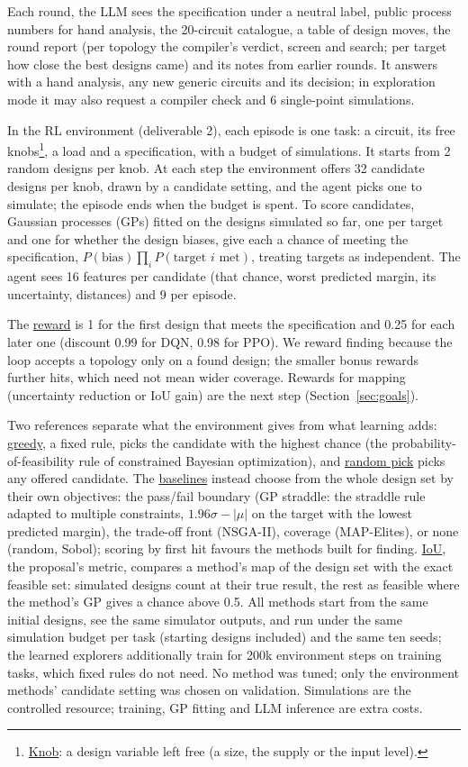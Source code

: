 \documentclass[10pt]{article}
\begin{document}
Each round, the LLM sees the specification under a neutral label, public process numbers for hand analysis, the 20-circuit catalogue, a table of design moves, the round
report (per topology the compiler's verdict, screen and search; per target how close the best designs came) and its
notes from earlier rounds. It answers with a hand analysis, any new generic circuits and its decision; in exploration
mode it may also request a compiler check and 6 single-point simulations.

In the RL environment (deliverable 2), each episode is one task: a circuit, its free knobs\footnote{\uline{Knob}: a design variable left free (a size, the supply or the input level).}, a load and a specification,
with a budget of simulations. It starts from 2 random designs per knob. At each step the environment offers 32
candidate designs per knob, drawn by a candidate setting, and the agent picks one to simulate; the episode ends when
the budget is spent. To score candidates, Gaussian processes (GPs) fitted on the designs simulated so far, one per
target and one for whether the design biases, give each a chance of meeting the specification,
$P(\text{bias})\prod_i P(\text{target } i \text{ met})$, treating targets as independent. The agent sees 16 features
per candidate (that chance, worst predicted margin, its uncertainty, distances) and 9 per episode.

The \uline{reward} is 1 for the first design that meets the specification and 0.25 for each later one (discount 0.99
for DQN, 0.98 for PPO). We reward finding because the loop accepts a topology only on a found design; the smaller
bonus rewards further hits, which need not mean wider coverage. Rewards for mapping (uncertainty reduction or IoU gain) are the next step (Section~\ref{sec:goals}).

Two references separate what the environment gives from what learning adds: \uline{greedy}, a fixed rule, picks the
candidate with the highest chance (the probability-of-feasibility rule of constrained Bayesian optimization), and
\uline{random pick} picks any offered candidate. The \uline{baselines} instead choose from the whole design set by
their own objectives: the pass/fail boundary (GP straddle: the straddle rule~\cite{bryan,gotovos} adapted to multiple
constraints, $1.96\sigma - |\mu|$ on the target with the lowest predicted margin), the trade-off front (NSGA-II), coverage (MAP-Elites), or none (random,
Sobol); scoring by first hit favours the methods built for finding. \uline{IoU}, the proposal's metric, compares a
method's map of the design set with the exact feasible set: simulated designs count at their true result, the rest as
feasible where the method's GP gives a chance above 0.5. All methods start from the same initial designs, see the same simulator outputs, and run under the same simulation
budget per task (starting designs included) and the same ten seeds; the learned explorers additionally train for 200k environment
steps on training tasks, which fixed rules do not need. No method was tuned;
only the environment methods' candidate setting was chosen on validation. Simulations are the controlled resource; training, GP fitting and LLM
inference are extra costs.
\end{document}
